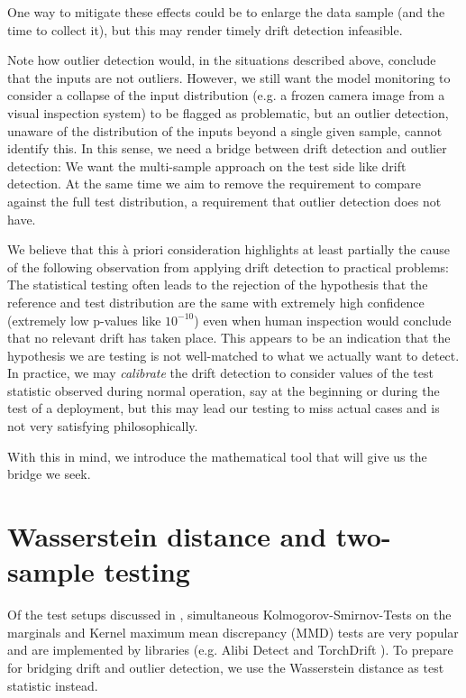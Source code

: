 \documentclass[a4paper,twoside,10pt]{article}
\theoremstyle{plain}
\theoremstyle{remark}
\begin{document}
One way to mitigate these effects could be to enlarge the data sample (and the time to collect it), but this may render timely drift detection infeasible.

Note how outlier detection would, in the situations described above, conclude that the inputs are not outliers. However, we still want the model monitoring to consider a collapse of the input distribution (e.g. a frozen camera image from a visual inspection system) to be flagged as problematic, but an outlier detection, unaware of the distribution of the inputs beyond a single given sample, cannot identify this. In this sense, we need a bridge between drift detection and outlier detection: We want the multi-sample approach on the test side like drift detection. At the same time we aim to remove the requirement to compare against the full test distribution, a requirement that outlier detection does not have. 

We believe that this à priori consideration highlights at least partially the cause of the following observation from applying drift detection to practical problems:
The statistical testing often leads to the rejection of the hypothesis that the reference and test distribution are the same with extremely high confidence (extremely low p-values like $10^{-10}$) even when human inspection would conclude that no relevant drift has taken place. This appears to be an indication that the hypothesis we are testing is not well-matched to what we actually want to detect.
In practice, we may \textit{calibrate} the drift detection to consider values of the test statistic observed during normal operation, say at the beginning or during the test of a deployment, but this may lead our testing to miss actual cases and is not very satisfying philosophically.

With this in mind, we introduce the mathematical tool that will give us the bridge we seek.

\section{Wasserstein distance and two-sample testing}


Of the test setups discussed in \cite{FailingLoudly}, simultaneous Kolmogorov-Smirnov-Tests on the marginals and Kernel maximum mean discrepancy (MMD) tests are very popular and are implemented by libraries (e.g. Alibi Detect \cite{alibidetect} and TorchDrift \cite{torchdrift}). To prepare for bridging drift and outlier detection, we use the Wasserstein distance as test statistic instead.
\end{document}

